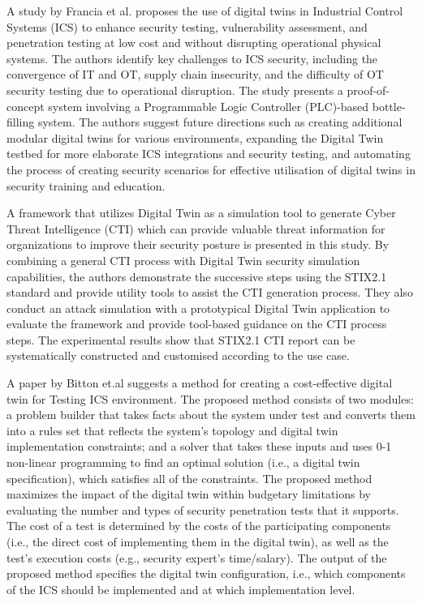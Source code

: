 A study by Francia et al.\cite{franciaDigitalTwinsIndustrial2021} proposes the use of digital twins in Industrial Control Systems (ICS) to enhance security testing, vulnerability assessment, and penetration testing at low cost and without disrupting operational physical systems. The authors identify key challenges to ICS security, including the convergence of IT and OT, supply chain insecurity, and the difficulty of OT security testing due to operational disruption. The study presents a proof-of-concept system involving a Programmable Logic Controller (PLC)-based bottle-filling system. The authors suggest future directions such as creating additional modular digital twins for various environments, expanding the Digital Twin testbed for more elaborate ICS integrations and security testing, and automating the process of creating security scenarios for effective utilisation of digital twins in security training and education.

A framework that utilizes Digital Twin as a simulation tool to generate Cyber Threat Intelligence (CTI) which can provide valuable threat information for organizations to improve their security posture is presented in this study\cite{dietzHarnessingDigitalTwin2022}. By combining a general CTI process with Digital Twin security simulation capabilities, the authors demonstrate the successive steps using the STIX2.1 standard and provide utility tools to assist the CTI generation process. They also conduct an attack simulation with a prototypical Digital Twin application to evaluate the framework and provide tool-based guidance on the CTI process steps. The experimental results show that STIX2.1 CTI report can be systematically constructed and customised according to the use case. 


A paper by Bitton et.al \cite{bittonDerivingCostEffectiveDigital2018a} suggests a method for creating a cost-effective digital twin for Testing ICS environment. The proposed method consists of two modules: a problem builder that takes facts about the system under test and converts them into a rules set that reflects the system's topology and digital twin implementation constraints; and a solver that takes these inputs and uses 0-1 non-linear programming to find an optimal solution (i.e., a digital twin specification), which satisfies all of the constraints. The proposed method maximizes the impact of the digital twin within budgetary limitations by evaluating the number and types of security penetration tests that it supports. The cost of a test is determined by the costs of the participating components (i.e., the direct cost of implementing them in the digital twin), as well as the test's execution costs (e.g., security expert's time/salary). The output of the proposed method specifies the digital twin configuration, i.e., which components of the ICS should be implemented and at which implementation level.

